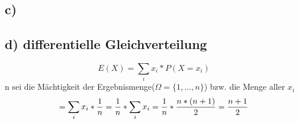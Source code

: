 \documentclass[11pt]{article} %
\begin{document}
\subsection*{c)}
\subsection*{d) differentielle Gleichverteilung}
$$
E(X) = \sum_i x_i * P(X=x_i) 
$$
n sei die Mächtigkeit der Ergebnismenge($\Omega = \{1, ... , n\} $) bzw. die Menge aller $x_i$
$$
=\sum_i x_i * \frac{1}{n} \\
= \frac{1}{n} * \sum_i x_i  \\
= \frac{1}{n} * \frac{n * (n+1)}{2} \\
=\frac{n+1}{2}
$$
\end{document}

